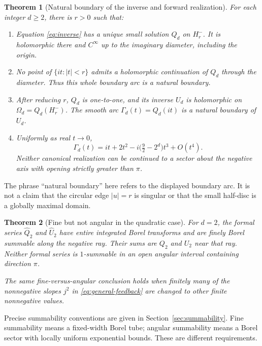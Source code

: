 \documentclass[11pt,a4paper]{article}
\numberwithin{equation}{section}
\newtheorem{theorem}{Theorem}[section]
\theoremstyle{definition}\newtheorem{definition}[theorem]{Definition}
\theoremstyle{remark}\newtheorem{remark}[theorem]{Remark}
\theoremstyle{definition}
\newcommand{\Uhat}{\widehat U}\newcommand{\Qhat}{\widehat Q}
\begin{document}
\begin{theorem}[Natural boundary of the inverse and forward realization]
\label{thm:main}
For each integer $d\ge2$, there is $r>0$ such that:
\begin{enumerate}[label=(\roman*)]
\item Equation \eqref{eq:inverse} has a unique small solution $Q_d$ on
$H_r^-$. It is holomorphic there and $C^\infty$ up to the imaginary diameter,
including the origin.
\item No point of $\{it:|t|<r\}$ admits a holomorphic continuation of $Q_d$
through the diameter. Thus this whole boundary arc is a natural boundary.
\item After reducing $r$, $Q_d$ is one-to-one, and its inverse $U_d$ is
holomorphic on $\Omega_d=Q_d(H_r^-)$. The smooth arc
$\Gamma_d(t)=Q_d(it)$ is a natural boundary of $U_d$.
\item Uniformly as real $t\to0$,
\begin{equation}
 \Gamma_d(t)=it+2t^2-i\bigl(\tfrac92-2^d\bigr)t^3+O(t^4).
 \label{eq:boundary-shape-main}
\end{equation}
Neither canonical realization can be continued to a sector about the negative
axis with opening strictly greater than $\pi$.
\end{enumerate}
\end{theorem}
The phrase ``natural boundary'' here refers to the displayed boundary arc.
It is not a claim that the circular edge $|u|=r$ is singular or that the small
half-disc is a globally maximal domain.

\begin{theorem}[Fine but not angular in the quadratic case]
\label{thm:quadratic-main}
For $d=2$, the formal series $\Qhat_2$ and $\Uhat_2$ have entire integrated
Borel transforms and are finely Borel summable along the negative ray. Their
sums are $Q_2$ and $U_2$ near that ray. Neither formal series is $1$-summable in
an open angular interval containing direction $\pi$.

The same fine-versus-angular conclusion holds when finitely many of the
nonnegative slopes $j^2$ in \eqref{eq:general-feedback} are changed to other
finite nonnegative values.
\end{theorem}
Precise summability conventions are given in Section~\ref{sec:summability}.
Fine summability means a fixed-width Borel tube; angular summability means a
Borel sector with locally uniform exponential bounds. These are different
requirements.
\end{document}
